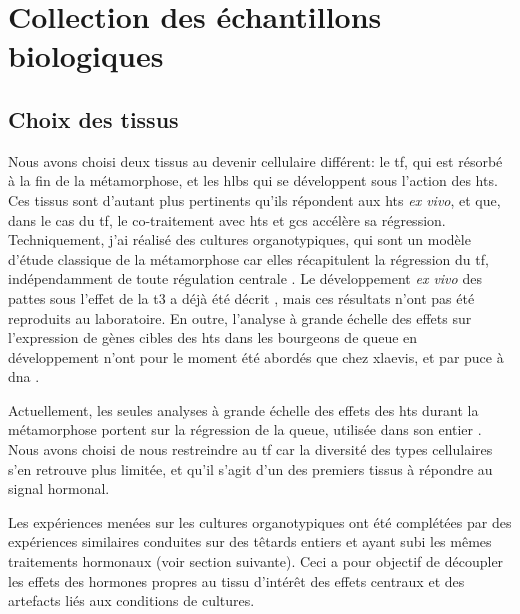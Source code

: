 \documentclass[../main.tex]{subfiles}
\begin{document}

\section{Collection des échantillons biologiques}\label{sec:col-bio-samples}

\subsection{Choix des tissus}

Nous avons choisi deux tissus au devenir cellulaire différent: le \gls{tf}, qui est résorbé à la fin de la métamorphose, et les \glspl{hlb} qui se développent sous l'action des \glspl{ht}.
Ces tissus sont d'autant plus pertinents qu'ils répondent aux \glspl{ht} \textit{ex vivo}, et que, dans le cas du \gls{tf}, le co-traitement avec \glspl{ht} et \glspl{gc} accélère sa régression.
Techniquement, j'ai réalisé des cultures organotypiques, qui sont un modèle d'étude classique de la métamorphose car elles récapitulent la régression du \gls{tf}, indépendamment de toute régulation centrale \citep{Kikuyama1982,Kikuyama1983,Galton1990}.
Le développement \textit{ex vivo} des pattes sous l'effet de la \gls{t3} a déjà été décrit \citep{Tata1991}, mais ces résultats n'ont pas été reproduits au laboratoire.
En outre, l'analyse à grande échelle des effets sur l'expression de gènes cibles des \glspl{ht} dans les bourgeons de queue en développement n'ont pour le moment été abordés que chez \gls{xlaevis}, et par puce à \gls{dna} \citep{Buckbinder1992}.
\par
Actuellement, les seules analyses à grande échelle des effets des \glspl{ht} durant la métamorphose portent sur la régression de la queue, utilisée dans son entier \citep{Wang1993,Helbing2003,Kulkarni2012}.
Nous avons choisi de nous restreindre au \gls{tf} car la diversité des types cellulaires s'en retrouve plus limitée, et qu'il s'agit d'un des premiers tissus à répondre au signal hormonal.
\par
Les expériences menées sur les cultures organotypiques ont été complétées par des expériences similaires conduites sur des têtards entiers et ayant subi les mêmes traitements hormonaux (voir section suivante).
Ceci a pour objectif de découpler les effets des hormones propres au tissu d'intérêt des effets centraux et des artefacts liés aux conditions de cultures.
%
\end{document}
